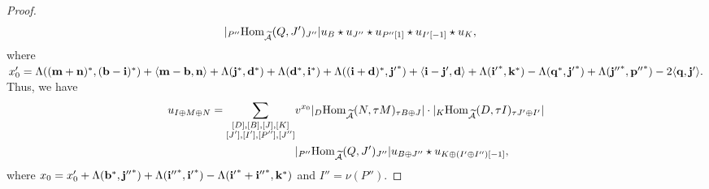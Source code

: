 \documentclass[reqno,12pt]{amsart}
\numberwithin{equation}{section}
\def\lr#1{\langle #1\rangle} \def\fin{\hfill$\square$}  \def\lra{\longrightarrow} \def\mod{\mbox{\rm \textbf{mod}}\,}\def\Mod{\mbox{\rm mod}\,}\def\top{\mbox{\rm top}\,}\def\soc{\mbox{\rm soc}\,}
\theoremstyle{plain} %
\theoremstyle{definition} %
\begin{document}
\begin{proof}
\begin{equation*}
\begin{split}
&|_{P''}\mbox{\rm Hom}_{\widetilde{\mathcal{A}}}(Q,J')_{J''}| u_B\star u_{J''}\star u_{P''[1]}\star u_{I'[-1]}\star u_K,
\end{split}\end{equation*}
where $x'_0=\Lambda((\mathbf{m}+\mathbf{n})^\ast,(\mathbf{b}-\mathbf{i})^\ast)+\langle \mathbf{m}-\mathbf{b},\mathbf{n}\rangle+\Lambda({\bf j}^\ast,{\bf d}^\ast)+\Lambda({\bf d}^\ast,{\bf i}^\ast)+\Lambda(({\bf i}+{\bf d})^\ast,{{\bf j}'}^\ast)+\lr{{\bf i}-{\bf j}',{\bf d}}+\Lambda({{\bf i}'}^\ast,{\bf k}^\ast)-\Lambda({\bf q}^\ast,{{\bf j}'}^\ast)+\Lambda({{\bf j}''}^\ast,{{\bf p}''}^\ast)-2\lr{{\bf q},{\bf j}'}.$
Thus, we have
\begin{equation*}
\begin{split}
u_{I\oplus M\oplus N}
=\sum_{\substack{[D],[B],[J], [K]\\ [J'],[I'], [P''],[J'']}}&v^{x_0}|_D\mbox{\rm Hom}_{\widetilde{\mathcal{A}}}(N,\tau M)_{\tau B\oplus J}|\cdot |_K\mbox{\rm Hom}_{\widetilde{\mathcal{A}}}(D,\tau I)_{\tau J'\oplus I'}|\\
&|_{P''}\mbox{\rm Hom}_{\widetilde{\mathcal{A}}}(Q,J')_{J''}| u_{B\oplus J''}\star u_{K\oplus(I'\oplus I'')[-1]},
\end{split}\end{equation*}
where $x_0=x'_0+\Lambda({\bf b}^\ast,{{\bf j}''}^\ast)+\Lambda({{\bf i}''}^\ast,{{\bf i}'}^\ast)-\Lambda({{\bf i}'}^\ast+{{\bf i}''}^\ast,{\bf k}^\ast)$ and $I''=\nu(P'')$.


\end{proof}
\end{document}
